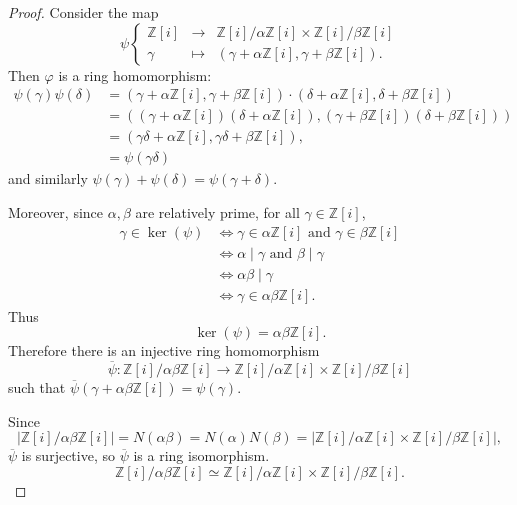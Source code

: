 \documentclass[11pt,a4paper]{article}
\newcommand{\Z}{\mathbb{Z}}
\begin{document}
\begin{proof} 
Consider the map
$$
\psi
\left\{
\begin{array}{ccc}
\Z[i] & \to & \Z[i]/ \alpha \Z[i] \times \Z[i]/\beta \Z[i]\\
\gamma & \mapsto & (\gamma + \alpha \Z[i], \gamma + \beta \Z[i]).
\end{array}
\right.
$$
Then $\varphi$ is a ring homomorphism:
\begin{align*}
\psi(\gamma) \psi(\delta) &= (\gamma + \alpha \Z[i], \gamma + \beta \Z[i]) \cdot (\delta + \alpha \Z[i], \delta + \beta \Z[i])\\
&= ((\gamma + \alpha \Z[i])(\delta + \alpha \Z[i]), (\gamma + \beta \Z[i])(\delta + \beta \Z[i]))\\
&=(\gamma \delta + \alpha \Z[i], \gamma \delta + \beta \Z[i]),\\
&= \psi(\gamma \delta)
\end{align*}
and similarly $\psi(\gamma) + \psi(\delta) = \psi(\gamma + \delta)$.

Moreover, since $\alpha, \beta$ are relatively prime, for all $\gamma \in \Z[i]$,
\begin{align*}
\gamma \in \ker(\psi) & \iff \gamma \in \alpha \Z[i] \text{ and } \gamma \in \beta \Z[i]\\
 & \iff \alpha \mid \gamma \text{ and }\beta \mid \gamma\\
 & \iff \alpha \beta \mid \gamma\\
 & \iff  \gamma \in \alpha \beta \Z[i].
 \end{align*}
Thus 
$$\ker(\psi) = \alpha \beta \Z[i].$$
Therefore there is an injective ring homomorphism
$$\overline{\psi}: \Z[i]/\alpha\beta \Z[i] \to  \Z[i]/ \alpha \Z[i] \times \Z[i]/\beta \Z[i]$$
such that $\overline{\psi}(\gamma + \alpha \beta \Z[i]) = \psi(\gamma)$.

Since
$$\left |\Z[i]/\alpha\beta \Z[i] \right | = N(\alpha \beta) = N(\alpha) N(\beta) =\left |\Z[i]/ \alpha \Z[i] \times \Z[i]/\beta \Z[i] \right|,$$
$\overline{\psi}$ is surjective, so $\overline{\psi}$ is a ring isomorphism.
$$\Z[i]/\alpha\beta \Z[i] \simeq \Z[i]/ \alpha \Z[i] \times \Z[i]/\beta \Z[i].$$
\end{proof}
\end{document}
